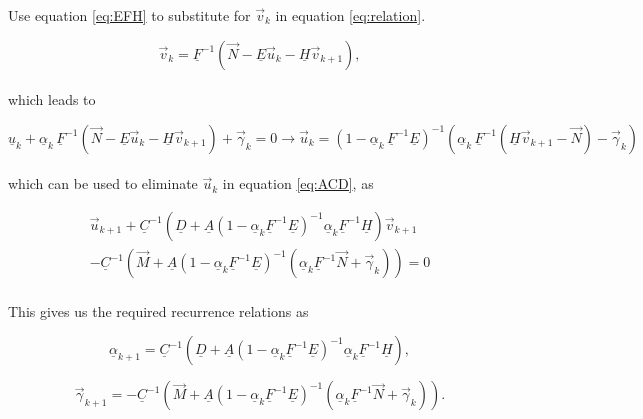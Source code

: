 \documentclass[11pt]{amsart}
\begin{document}
Use equation \ref{eq:EFH} to substitute for $\vec{v}_{k}$ in equation \ref{eq:relation}.

\begin{equation} \label{eq:IIa}
\vec{v}_{k}  = \underline{F}^{-1}  \left( \vec{N} - \underline{E}  \vec{u}_{k}  - \underline{H} \vec{v}_{k+1} \right),
\end{equation}
\\
which leads to

\begin{equation} \label{eq:IIb}
 \underline{u}_{k}  + \underline{\alpha}_{k} \, \underline{F}^{-1} \left( \vec{N}  - \underline{E} \vec{u}_{k} - \underline{H} \vec{v}_{k+1}  \right)  +  \vec{\gamma}_{k}  =  0      \longrightarrow       \vec{u}_{k}  =  \left(  1 - \underline{\alpha}_{k} \, \underline{F}^{-1} \underline{E}  \right)^{-1}     \left(   \underline{\alpha}_{k} \, \underline{F}^{-1}  \left(  \underline{H}  \vec{v}_{k+1} - \vec{N} \right) - \vec{\gamma}_{k}  \right)
\end{equation} 
\\
which can be used to eliminate $\vec{u}_{k}$ in equation \ref{eq:ACD}, as

\begin{multline} \label{eq:IIc}
\vec{u}_{k+1}  + \underline{C}^{-1} \left(  \underline{D}  + \underline{A} \left( 1 - \underline{\alpha}_{k} \underline{F}^{-1} \underline{E}  \right)^{-1} \underline{\alpha}_{k} \underline{F}^{-1} \underline{H}    \right) \vec{v}_{k+1} \\
   -   \underline{C}^{-1} \left(  \vec{M}  +  \underline{A} \left( 1 - \underline{\alpha}_{k} \underline{F}^{-1} \underline{E}  \right)^{-1} \left(  \underline{\alpha}_{k} \underline{F}^{-1} \vec{N}  +  \vec{\gamma}_{k}   \right)  \right)   =  0
\end{multline} 
\\


This gives us the required recurrence relations as

\begin{equation} \label{eq:IIalpha}
\underline{\alpha}_{k+1}  =  \underline{C}^{-1} \left(  \underline{D}  + \underline{A} \left( 1 - \underline{\alpha}_{k} \underline{F}^{-1} \underline{E}  \right)^{-1} \underline{\alpha}_{k} \underline{F}^{-1} \underline{H}    \right) ,
\end{equation} 

\begin{equation} \label{eq:IIgamma}
\vec{\gamma}_{k+1}  =  -   \underline{C}^{-1} \left(  \vec{M}  +  \underline{A} \left( 1 - \underline{\alpha}_{k} \underline{F}^{-1} \underline{E}  \right)^{-1} \left(  \underline{\alpha}_{k} \underline{F}^{-1} \vec{N}  +  \vec{\gamma}_{k}   \right)  \right) .
\end{equation} 
\\
\end{document}
